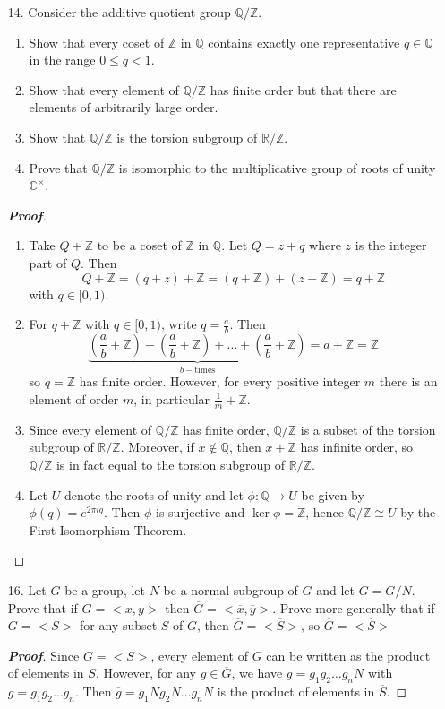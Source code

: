 \documentclass[12pt,leqno]{book}
\theoremstyle{definition}
\newcommand{\Z}{\mathbb{Z}}
\newcommand{\Q}{\mathbb{Q}}
\newcommand{\R}{\mathbb{R}}
\newcommand{\C}{\mathbb{C}}
\newenvironment{Proof}{\begin{proof}[\textnormal{\textbf{Proof}}]}{\end{proof}}
\begin{document}
\begin{enumerate}
 \item [14.] Consider the additive quotient group $\Q/\Z$. 
  \begin{enumerate}
   \item Show that every coset of $\Z$ in $\Q$ contains exactly one representative $q\in\Q$ in the range $0\leq q<1$.
   \item Show that every element of $\Q/\Z$ has finite order but that there are elements of arbitrarily large order.
   \item Show that $\Q/\Z$ is the torsion subgroup of $\R/\Z$.
   \item Prove that $\Q/\Z$ is isomorphic to the multiplicative group of roots of unity $\C^{\times}$. 
  \end{enumerate}
\begin{Proof}
 \begin{enumerate}
  \item Take $Q+\Z$ to be a coset of $\Z$ in $\Q$. Let $Q=z+q$ where $z$ is the integer part of $Q$. Then \[Q+\Z=(q+z)+\Z=(q+\Z)+(z+\Z)=q+\Z\] with $q\in[0,1)$. 
  \item For $q+\Z$ with $q\in[0,1)$, write $q=\frac{a}{b}$. Then \[\underbrace{\left(\frac{a}{b}+\Z\right)+\left(\frac{a}{b}+\Z\right)+\hdots+\left(\frac{a}{b}+\Z\right)}_{b-\text{times}}=a+\Z=\Z\] so $q=\Z$ has finite order. However, for every positive integer $m$ there is an element of order $m$, in particular $\frac{1}{m}+\Z$.
  \item Since every element of $\Q/\Z$ has finite order, $\Q/\Z$ is a subset of the torsion subgroup of $\R/\Z$. Moreover, if $x\notin\Q$, then $x+\Z$ has infinite order, so $\Q/\Z$ is in fact equal to the torsion subgroup of $\R/\Z$.
  \item Let $U$ denote the roots of unity and let $\phi:\Q\to U$ be given by $\phi(q)=e^{2\pi iq}$. Then $\phi$ is surjective and $\ker\phi=\Z$, hence $\Q/\Z\cong U$ by the First Isomorphism Theorem.
 \end{enumerate}

\end{Proof}

 \item [16.] Let $G$ be a group, let $N$ be a normal subgroup of $G$ and let $\overline{G}=G/N$. Prove that if $G=<x,y>$ then $\overline{G}=<\overline{x},\overline{y}>$. Prove more generally that if $G=<S>$ for any subset $S$ of $G$, then $\overline{G}=<\overline{S}>$, so $\overline{G}=<\overline{S}>$

\begin{Proof}
 Since $G=<S>$, every element of $G$ can be written as the product of elements in $S$. However, for any $\overline{g}\in\overline{G}$, we have $\overline{g}=g_1g_2\hdots g_nN$ with $g=g_1g_2\hdots g_n$. Then $\overline{g}=g_1Ng_2N\hdots g_nN$ is the product of elements in $\overline{S}$.  
\end{Proof}


\end{enumerate}
\end{document}
